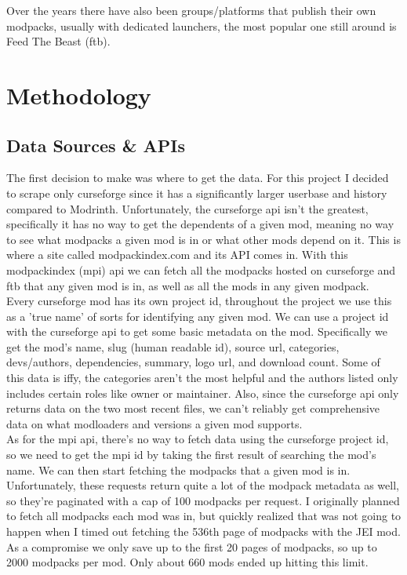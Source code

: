 \documentclass[a4paper,12pt, twocolumn]{article}
\begin{document}
Over the years there have also been groups/platforms that publish their own modpacks, usually with dedicated launchers, the most popular one still around is Feed The Beast (ftb).

\section{Methodology}

\subsection{Data Sources \& APIs}

The first decision to make was where to get the data. For this project I decided to scrape only curseforge since it has a significantly larger userbase and history compared to Modrinth. Unfortunately, the curseforge api isn't the greatest, specifically it has no way to get the dependents of a given mod, meaning no way to see what modpacks a given mod is in or what other mods depend on it. This is where a site called modpackindex.com and its API comes in. With this modpackindex (mpi) api we can fetch all the modpacks hosted on curseforge and ftb that any given mod is in, as well as all the mods in any given modpack.\\

Every curseforge mod has its own project id, throughout the project we use this as a 'true name' of sorts for identifying any given mod. We can use a project id with the curseforge api to get some basic metadata on the mod. Specifically we get the mod's name, slug (human readable id), source url, categories, devs/authors, dependencies, summary, logo url, and download count. Some of this data is iffy, the categories aren't the most helpful and the authors listed only includes certain roles like owner or maintainer. Also, since the curseforge api only returns data on the two most recent files, we can't reliably get comprehensive data on what modloaders and versions a given mod supports.\\

As for the mpi api, there's no way to fetch data using the curseforge project id, so we need to get the mpi id by taking the first result of searching the mod's name. We can then start fetching the modpacks that a given mod is in. Unfortunately, these requests return quite a lot of the modpack metadata as well, so they're paginated with a cap of 100 modpacks per request. I originally planned to fetch all modpacks each mod was in, but quickly realized that was not going to happen when I timed out fetching the 536th page of modpacks with the JEI mod. As a compromise we only save up to the first 20 pages of modpacks, so up to 2000 modpacks per mod. Only about 660 mods ended up hitting this limit.\\
\end{document}
